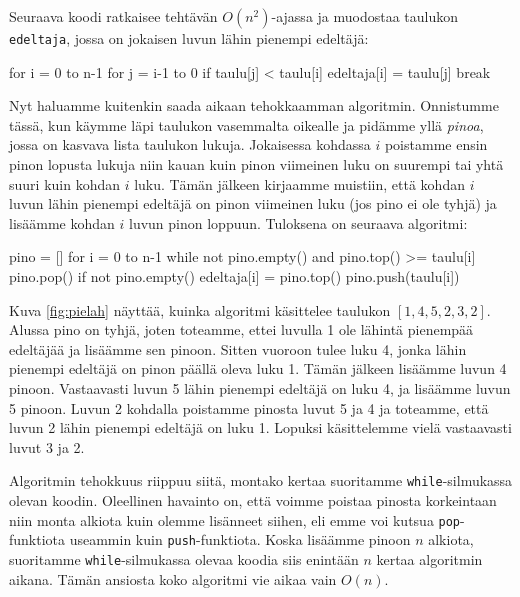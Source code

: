 Seuraava koodi ratkaisee tehtävän $O(n^2)$-ajassa ja muodostaa
taulukon \texttt{edeltaja}, jossa on jokaisen luvun lähin pienempi edeltäjä:

\begin{code}
for i = 0 to n-1
    for j = i-1 to 0
        if taulu[j] < taulu[i]
            edeltaja[i] = taulu[j]
            break
\end{code}

Nyt haluamme kuitenkin saada aikaan tehokkaamman algoritmin.
Onnistumme tässä, kun käymme läpi taulukon
vasemmalta oikealle ja pidämme yllä \emph{pinoa}, jossa on
kasvava lista taulukon lukuja.
Jokaisessa kohdassa $i$ poistamme ensin pinon lopusta lukuja
niin kauan kuin pinon viimeinen luku on suurempi tai yhtä
suuri kuin kohdan $i$ luku.
Tämän jälkeen kirjaamme muistiin, että kohdan $i$ luvun
lähin pienempi edeltäjä on pinon viimeinen luku (jos pino ei ole tyhjä) ja
lisäämme kohdan $i$ luvun pinon loppuun.
Tuloksena on seuraava algoritmi:

\begin{code}
pino = []
for i = 0 to n-1
    while not pino.empty() and pino.top() >= taulu[i]
        pino.pop()
    if not pino.empty()
        edeltaja[i] = pino.top()
    pino.push(taulu[i])
\end{code}

Kuva \ref{fig:pielah} näyttää, kuinka algoritmi käsittelee taulukon $[1,4,5,2,3,2]$.
Alussa pino on tyhjä, joten toteamme, ettei luvulla 1
ole lähintä pienempää edeltäjää ja lisäämme sen pinoon.
Sitten vuoroon tulee luku 4, jonka lähin pienempi edeltäjä
on pinon päällä oleva luku 1. Tämän jälkeen lisäämme luvun 4 pinoon.
Vastaavasti luvun 5 lähin pienempi edeltäjä on luku 4,
ja lisäämme luvun 5 pinoon.
Luvun 2 kohdalla poistamme pinosta luvut 5 ja 4
ja toteamme, että luvun 2 lähin pienempi edeltäjä on luku 1.
Lopuksi käsittelemme vielä vastaavasti luvut 3 ja 2.

Algoritmin tehokkuus riippuu siitä, montako kertaa suoritamme
\texttt{while}-silmukassa olevan koodin.
Oleellinen havainto on, että voimme poistaa pinosta
korkeintaan niin monta alkiota kuin olemme lisänneet siihen,
eli emme voi kutsua \texttt{pop}-funktiota useammin kuin \texttt{push}-funktiota.
Koska lisäämme pinoon $n$ alkiota, suoritamme \texttt{while}-silmukassa
olevaa koodia siis enintään $n$ kertaa algoritmin aikana.
Tämän ansiosta koko algoritmi vie aikaa vain $O(n)$.